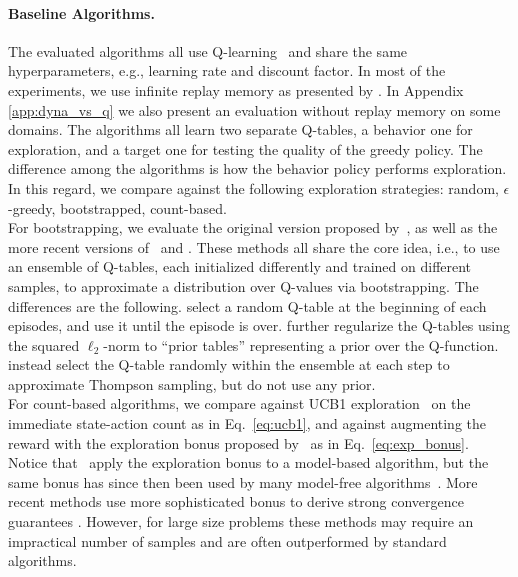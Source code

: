 \documentclass{article}
\begin{document}
\paragraph{Baseline Algorithms.} The evaluated algorithms all use Q-learning~\citep{watkins1992q} and share the same hyperparameters, e.g., learning rate and discount factor. In most of the experiments, we use infinite replay memory as presented by \citet{osband2019deep}.
In Appendix \ref{app:dyna_vs_q} we also present an evaluation without replay memory on some domains.
The algorithms all learn two separate Q-tables, a behavior one for exploration, and a target one for testing the quality of the greedy policy. 
The difference among the algorithms is how the behavior policy performs exploration. In this regard, we compare against the following exploration strategies: random, $\epsilon$-greedy, bootstrapped, count-based.
\\
For bootstrapping, we evaluate the original version proposed by~\citet{osband2016deep}, as well as the more recent versions of~\citet{deramo2019exploiting} and \citet{osband2019deep}.
These methods all share the core idea, i.e., to use an ensemble of Q-tables, each initialized differently and trained on different samples, to approximate a distribution over Q-values via bootstrapping. 
The differences are the following. \citet{osband2016deep} select a random Q-table at the beginning of each episodes, and use it until the episode is over. \citet{osband2019deep} further regularize the Q-tables using the squared $\ell_2$-norm to ``prior tables'' representing a prior over the Q-function.
\citet{deramo2019exploiting} instead select the Q-table randomly within the ensemble at each step to approximate Thompson sampling, but do not use any prior.
\\
For count-based algorithms, we compare against UCB1 exploration~\citep{auer2002finite} on the immediate state-action count as in Eq.~\eqref{eq:ucb1}, and against augmenting the reward with the exploration bonus proposed by~\citet{strehl2008analysis} as in Eq.~\eqref{eq:exp_bonus}. Notice that~\citet{strehl2008analysis} apply the exploration bonus to a model-based algorithm, but the same bonus has since then been used by many model-free algorithms~\citep{bellemare2016unifying,dong2019q}.
More recent methods use more sophisticated bonus to derive strong convergence guarantees \citep{jin2018iq,dong2019q}.
However, for large size problems these methods may require an impractical number of samples and are often outperformed by standard algorithms.
\end{document}
